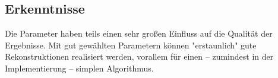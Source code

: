 \documentclass[german,notitlepage,smartquotes]{hgbreport}
\begin{document}

\clearpage

\subsection{Erkenntnisse}

Die Parameter haben teils einen sehr großen Einfluss auf die Qualität der Ergebnisse. Mit gut gewählten Parametern können "erstaunlich" gute Rekonstruktionen realisiert werden, vorallem für einen -- zumindest in der Implementierung -- simplen Algorithmus.








\end{document}
